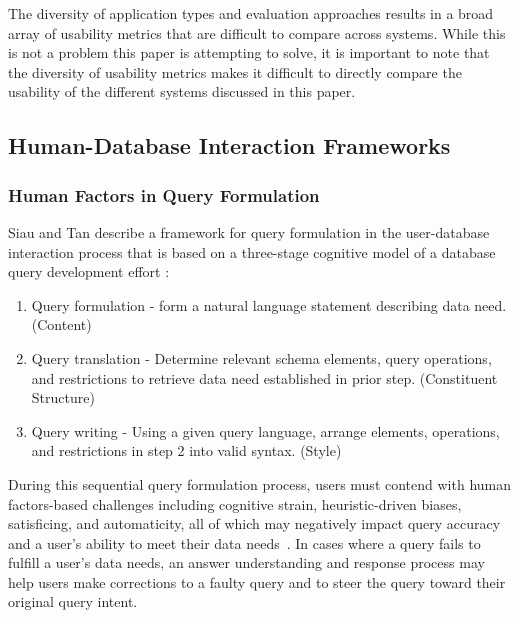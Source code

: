 The diversity of application types and evaluation approaches results in a broad array of usability metrics that are difficult to compare across systems. 
While this is not a problem this paper is attempting to solve, it is important to note that the diversity of usability metrics makes it difficult to directly compare the usability of the different systems discussed in this paper.

\subsection{Human-Database Interaction Frameworks}

\subsubsection{Human Factors in Query Formulation} Siau and Tan describe a framework for query formulation in the user-database interaction process that is based on a three-stage cognitive model of a database query development effort \cite{1637793}:

\begin{enumerate}
  \item Query formulation - form a natural language statement describing data need. (Content)
  \item Query translation - Determine relevant schema elements, query operations, and restrictions to retrieve data need established in prior step. (Constituent Structure)
  \item Query writing - Using a given query language, arrange elements, operations, and restrictions in step 2 into valid syntax. (Style)
\end{enumerate}


During this sequential query formulation process, users must contend with human factors-based challenges including cognitive strain, heuristic-driven biases, satisficing, and automaticity, all of which may negatively impact query accuracy and a user's ability to meet their data needs~\cite{1637793}. 
In cases where a query fails to fulfill a user's data needs, an answer understanding and response process may help users make corrections to a faulty query and to steer the query toward their original query intent.

